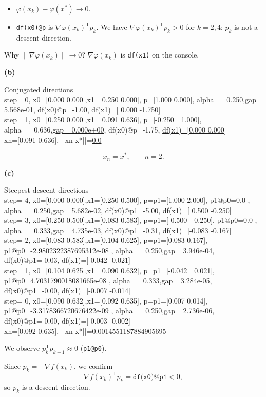\documentclass[11pt,a4paper]{article}
\newcommand{\T}{^{\mathsf T}}
\newcommand{\console}[1]{\par\noindent\colorbox{codebg}{\parbox{\dimexpr\linewidth-2\fboxsep}{\color{white}\scriptsize\ttfamily #1}}\par}
\begin{document}
\begin{itemize}[leftmargin=7.5em]
\item[(gap)] $\varphi(x_k)-\varphi(x^*)\to 0$.
\item[(direction)] \texttt{df(x0)@p} is $\nabla\varphi(x_k)\T p_k$. We have $\nabla\varphi(x_k)\T p_k>0$ for $k=2,4$: $p_k$ is not a descent direction.
\end{itemize}
{\color{remark}Why $\|\nabla\varphi(x_k)\|\to 0$? \quad $\nabla\varphi(x_k)$ is \texttt{df(x1)} on the console.}

\textbf{(b)}
\console{%
[ITEM B] Conjugated directions\\
step= 0, x0=[0.000 0.000],x1=[0.250 0.000], p=[1.000 0.000], alpha=\ \ 0.250,gap= 5.568e-01, df(x0)@p=-1.00, df(x1)=[ 0.000 -1.750]\\
step= 1, x0=[0.250 0.000],x1=[0.091 0.636], p=[-0.250\ \ 1.000], alpha=\ \ 0.636,\textcolor{red!70}{\underline{gap= 0.000e+00}}, df(x0)@p=-1.75, \textcolor{red!70}{\underline{df(x1)=[0.000 0.000]}}\\
xn=[0.091 0.636], ||xn-x*||=\textcolor{red!70}{\underline{0.0}}}

\[
x_n=x^*,\qquad n=2.
\]

\textbf{(c)}
\console{%
[ITEM C] Steepest descent directions\\
step= 4, x0=[0.000 0.000],x1=[0.250 0.500], p=p1=[1.000 2.000], p1@p0=0.0 , alpha=\ \ 0.250,gap= 5.682e-02, df(x0)@p1=-5.00, df(x1)=[ 0.500 -0.250]\\
step= 3, x0=[0.250 0.500],x1=[0.083 0.583], p=p1=[-0.500\ \ 0.250], p1@p0=0.0 , alpha=\ \ 0.333,gap= 4.735e-03, df(x0)@p1=-0.31, df(x1)=[-0.083 -0.167]\\
step= 2, x0=[0.083 0.583],x1=[0.104 0.625], p=p1=[0.083 0.167], p1@p0=-2.9802322387695312e-08 , alpha=\ \ 0.250,gap= 3.946e-04, df(x0)@p1=-0.03, df(x1)=[ 0.042 -0.021]\\
step= 1, x0=[0.104 0.625],x1=[0.090 0.632], p=p1=[-0.042\ \ 0.021], p1@p0=4.7031790018081665e-08 , alpha=\ \ 0.333,gap= 3.284e-05, df(x0)@p1=-0.00, df(x1)=[-0.007 -0.014]\\
step= 0, x0=[0.090 0.632],x1=[0.092 0.635], p=p1=[0.007 0.014], p1@p0=-3.3178366720676422e-09 , alpha=\ \ 0.250,gap= 2.736e-06, df(x0)@p1=-0.00, df(x1)=[ 0.003 -0.002]\\
xn=[0.092 0.635], ||xn-x*||=0.0014551187884905695}

We observe $p_k\T p_{k-1}\approx 0$ (\texttt{p1@p0}).

Since $p_k=-\nabla f(x_k)$, we confirm
\[
\nabla f(x_k)\T p_k=\texttt{df(x0)@p1}<0,
\]
so $p_k$ is a descent direction.
\end{document}
